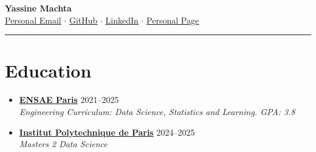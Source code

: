 \documentclass[letterpaper,11pt,twocolumn]{article}
\newcommand{\resumeSubheading}[4]{
	\vspace{-2pt}\item \textbf{#1} \hfill #2 \\
	\textit{\small #3} \hfill \textit{\small #4} 
	\vspace{-7pt}
}
\begin{document}
	
	\begin{center}
		{\LARGE \textbf{Yassine Machta}} \\[5pt]
		\href{mailto:machtayassine@gmail.com}{\underline{Personal Email}} $\cdot$ 
		\href{https://github.com/MachtaYassine}{ \underline{GitHub}} $\cdot$ 
		\href{https://www.linkedin.com/in/yassine-machta-a00307206/}{ \underline{LinkedIn}} $\cdot$ 
		\href{https://machtayassine.github.io}{ \underline{Personal Page}}
	\end{center}
	
	\vspace{-10pt}
	\hrule
	\vspace{-10pt}
	
	\section{Education}
	\begin{itemize}[leftmargin=*]
		\resumeSubheading
		{\href{https://www.ensae.fr/en}{ENSAE Paris}}{2021--2025}
		{Engineering Curriculum: Data Science, Statistics and Learning. GPA: 3.8}{}
		\resumeSubheading
		{\href{https://www.ip-paris.fr/}{Institut Polytechnique de Paris}}{2024--2025}
		{Masters 2 Data Science}{}
	\end{itemize}
	
\end{document}
